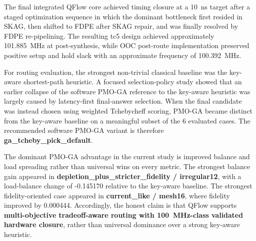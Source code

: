 The final integrated QFlow core achieved timing closure at a 10~ns target after a staged optimization sequence in which the dominant bottleneck first resided in SKAG, then shifted to FDPE after SKAG repair, and was finally resolved by FDPE re-pipelining. The resulting tc5 design achieved approximately 101.885~MHz at post-synthesis, while OOC post-route implementation preserved positive setup and hold slack with an approximate frequency of 100.392~MHz.

For routing evaluation, the strongest non-trivial classical baseline was the key-aware shortest-path heuristic. A focused selection-policy study showed that an earlier collapse of the software PMO-GA reference to the key-aware heuristic was largely caused by latency-first final-answer selection. When the final candidate was instead chosen using weighted Tchebycheff scoring, PMO-GA became distinct from the key-aware baseline on a meaningful subset of the 6 evaluated cases. The recommended software PMO-GA variant is therefore \textbf{ga\_tcheby\_pick\_default}.

The dominant PMO-GA advantage in the current study is improved balance and load spreading rather than universal wins on every metric. The strongest balance gain appeared in \textbf{depletion\_plus\_stricter\_fidelity / irregular12}, with a load-balance change of -0.145170 relative to the key-aware baseline. The strongest fidelity-oriented case appeared in \textbf{current\_like / mesh16}, where fidelity improved by 0.000444. Accordingly, the honest claim is that QFlow supports \textbf{multi-objective tradeoff-aware routing with 100~MHz-class validated hardware closure}, rather than universal dominance over a strong key-aware heuristic.
